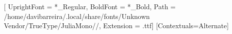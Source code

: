 \usepackage{fontspec}

\newfontfamily{}[
	UprightFont = *_Regular,
	BoldFont = *_Bold,
	Path = /home/davibarreira/.local/share/fonts/Unknown Vendor/TrueType/JuliaMono//,
	Extension = .ttf]
\newfontface{}
\newfontface{}
\setmonofont{JuliaMono-Medium}[Contextuals=Alternate]

